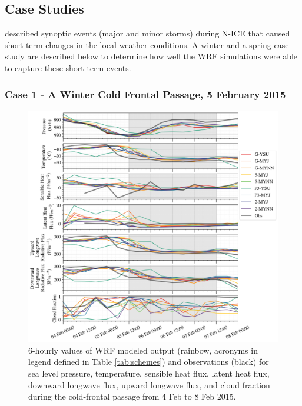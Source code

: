 \subsection{Case Studies}
\citet{cohen:2015} described synoptic events (major and minor storms) during N-ICE that caused short-term changes in the local weather conditions. A winter and a spring case study are described below to determine how well the WRF simulations were able to capture these short-term events.

\subsubsection{Case 1 - A Winter Cold Frontal Passage, 5 February 2015}
\begin{figure}[p]
    \centering \hspace*{-0.75cm}
    \includegraphics[width=1.1\linewidth]{figures/chapter3/wrf_case1.png}
    \caption[Polar WRF Case 1 - Winter cold front (5 Feb 2015) time series]{6-hourly values of WRF modeled output (rainbow, acronyms in legend defined in Table \ref{tab:schemes}) and observations (black) for sea level pressure, temperature, sensible heat flux, latent heat flux, downward longwave flux, upward longwave flux, and cloud fraction during the cold-frontal passage from 4 Feb to 8 Feb 2015.}
    \label{fig:wrf_case1}
\end{figure}

